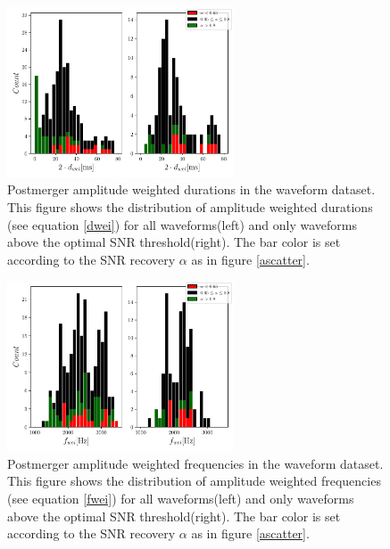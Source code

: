 \begin{figure}[hbt!]
\begin{center}
\includegraphics[width=0.6\textwidth, angle=0]{images/Data_analysis/results/alpha_dhist.pdf}
\captionsetup{width=0.8\textwidth}
\caption[Postmerger amplitude weighted durations in the waveform dataset]{Postmerger amplitude weighted durations in the waveform dataset. This figure shows the distribution of amplitude weighted durations (see equation \ref{dwei}) for all waveforms(left) and only waveforms above the optimal SNR threshold(right). The bar color is set according to the SNR recovery $\alpha$ as in figure \ref{ascatter}.}
\label{adhist}
\end{center}
\end{figure}



\begin{figure}[hbt!]
\begin{center}
\includegraphics[width=0.6\textwidth, angle=0]{images/Data_analysis/results/alpha_fhist.pdf}
\captionsetup{width=0.8\textwidth}
\caption[Postmerger amplitude weighted frequencies in the postmerger waveform dataset]{Postmerger amplitude weighted frequencies in the waveform dataset. This figure shows the distribution of amplitude weighted frequencies (see equation \ref{fwei}) for all waveforms(left) and only waveforms above the optimal SNR threshold(right). The bar color is set according to the SNR recovery $\alpha$ as in figure \ref{ascatter}.}
\label{afhist}
\end{center}
\end{figure}
\FloatBarrier


